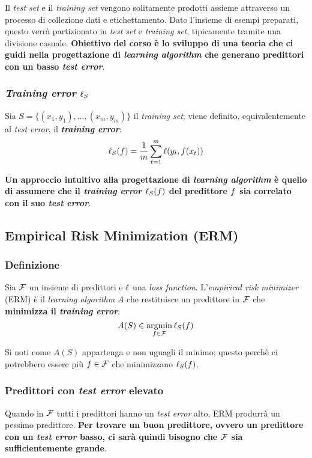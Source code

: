 \vspace{1em}

\begin{figure}[h]
    \centering
    
\end{figure}

Il \textit{test set} e il \textit{training set} vengono solitamente prodotti assieme
attraverso un processo di collezione dati e etichettamento. Dato l'insieme di esempi
preparati, questo verrà partizionato in \textit{test set} e \textit{training set},
tipicamente tramite una divisione casuale. \textbf{Obiettivo del corso è lo sviluppo
di una teoria che ci guidi nella progettazione di \textit{learning algorithm} che
generano predittori con un basso \textit{test error}}.

\subsubsection{\textit{Training error} \texorpdfstring{$\ell_S$}{l}}
Sia $S = \{(x_1,y_1),\dots,(x_m,y_m)\}$ il \textit{training set}; viene definito,
equivalentemente al \textit{test error}, il \textbf{\textit{training error}}:
$$ \ell_S(f) = \frac{1}{m}\sum_{t=1}^m \ell(y_t,f(x_t)) $$

\textbf{Un approccio intuitivo alla progettazione di \textit{learning algorithm} è 
quello di assumere che il \textit{training error} $\ell_S(f)$ del predittore 
$f$ sia correlato con il suo \textit{test error}}.

\subsection{Empirical Risk Minimization (ERM)}
\subsubsection{Definizione}
Sia $\mathcal{F}$ un insieme di predittori e $\ell$ una \textit{loss function}.
L'\textit{empirical risk minimizer} (ERM) è il \textit{learning algorithm} $A$
che restituisce un predittore in $\mathcal{F}$ che \textbf{minimizza il 
\textit{training error}}:
$$ A(S) \in \operatorname*{argmin}_{f \in \mathcal{F}} \ell_S(f) $$

Si noti come $A(S)$ appartenga e non uguagli il minimo; questo perchè ci 
potrebbero essere più $f \in \mathcal{F}$ che minimizzano $\ell_S(f)$.

\subsubsection{Predittori con \textit{test error} elevato}
Quando in $\mathcal{F}$ tutti i predittori hanno un \textit{test error} alto, ERM produrrà
un pessimo predittore. \textbf{Per trovare un buon predittore, ovvero un predittore
con un \textit{test error} basso, ci sarà quindi bisogno che $\mathcal{F}$ sia sufficientemente
grande}.

